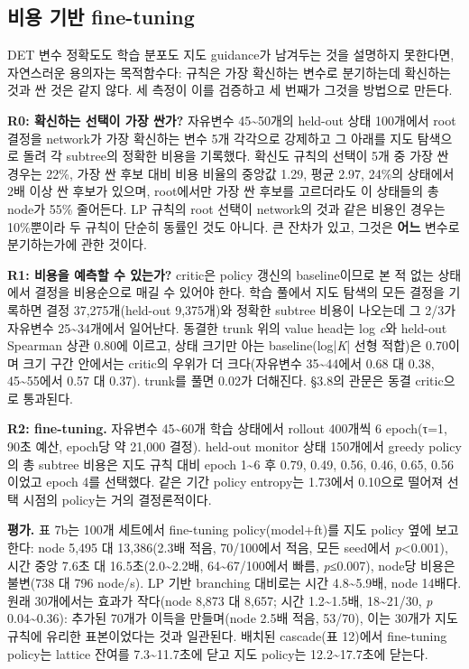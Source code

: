 \documentclass[final,5p,twocolumn]{elsarticle}
\begin{document}
\subsection{비용 기반 fine-tuning}
DET 변수 정확도도 학습 분포도 지도 guidance가 남겨두는 것을 설명하지 못한다면, 자연스러운 용의자는 목적함수다: 규칙은 가장 확신하는 변수로 분기하는데 확신하는 것과 싼 것은 같지 않다. 세 측정이 이를 검증하고 세 번째가 그것을 방법으로 만든다.

\textbf{R0: 확신하는 선택이 가장 싼가?} 자유변수 45\textasciitilde{}50개의 held-out 상태 100개에서 root 결정을 network가 가장 확신하는 변수 5개 각각으로 강제하고 그 아래를 지도 탐색으로 돌려 각 subtree의 정확한 비용을 기록했다. 확신도 규칙의 선택이 5개 중 가장 싼 경우는 22\%, 가장 싼 후보 대비 비용 비율의 중앙값 1.29, 평균 2.97, 24\%의 상태에서 2배 이상 싼 후보가 있으며, root에서만 가장 싼 후보를 고르더라도 이 상태들의 총 node가 55\% 줄어든다. LP 규칙의 root 선택이 network의 것과 같은 비용인 경우는 10\%뿐이라 두 규칙이 단순히 동률인 것도 아니다. 큰 잔차가 있고, 그것은 \textbf{어느} 변수로 분기하는가에 관한 것이다.

\textbf{R1: 비용을 예측할 수 있는가?} critic은 policy 갱신의 baseline이므로 본 적 없는 상태에서 결정을 비용순으로 매길 수 있어야 한다. 학습 풀에서 지도 탐색의 모든 결정을 기록하면 결정 37,275개(held-out 9,375개)와 정확한 subtree 비용이 나오는데 그 2/3가 자유변수 25\textasciitilde{}34개에서 일어난다. 동결한 trunk 위의 value head는 log \textit{c}와 held-out Spearman 상관 0.80에 이르고, 상태 크기만 아는 baseline(log|\textit{K}| 선형 적합)은 0.70이며 크기 구간 안에서는 critic의 우위가 더 크다(자유변수 35\textasciitilde{}44에서 0.68 대 0.38, 45\textasciitilde{}55에서 0.57 대 0.37). trunk를 풀면 0.02가 더해진다. §3.8의 관문은 동결 critic으로 통과된다.

\textbf{R2: fine-tuning.} 자유변수 45\textasciitilde{}60개 학습 상태에서 rollout 400개씩 6 epoch(τ=1, 90초 예산, epoch당 약 21,000 결정). held-out monitor 상태 150개에서 greedy policy의 총 subtree 비용은 지도 규칙 대비 epoch 1\textasciitilde{}6 후 0.79, 0.49, 0.56, 0.46, 0.65, 0.56이었고 epoch 4를 선택했다. 같은 기간 policy entropy는 1.73에서 0.10으로 떨어져 선택 시점의 policy는 거의 결정론적이다.

\textbf{평가.} 표 7b는 100개 세트에서 fine-tuning policy(model+ft)를 지도 policy 옆에 보고한다: node 5,495 대 13,386(2.3배 적음, 70/100에서 적음, 모든 seed에서 \textit{p}<0.001), 시간 중앙 7.6초 대 16.5초(2.0\textasciitilde{}2.2배, 64\textasciitilde{}67/100에서 빠름, \textit{p}≤0.007), node당 비용은 불변(738 대 796 node/s). LP 기반 branching 대비로는 시간 4.8\textasciitilde{}5.9배, node 14배다. 원래 30개에서는 효과가 작다(node 8,873 대 8,657; 시간 1.2\textasciitilde{}1.5배, 18\textasciitilde{}21/30, \textit{p} 0.04\textasciitilde{}0.36): 추가된 70개가 이득을 만들며(node 2.5배 적음, 53/70), 이는 30개가 지도 규칙에 유리한 표본이었다는 것과 일관된다. 배치된 cascade(표 12)에서 fine-tuning policy는 lattice 잔여를 7.3\textasciitilde{}11.7초에 닫고 지도 policy는 12.2\textasciitilde{}17.7초에 닫는다.
\end{document}
